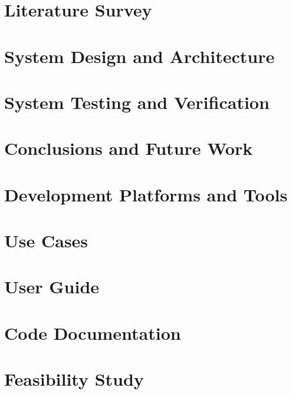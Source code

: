 \documentclass[a4paper,12pt]{article}
\begin{document}
\section{Literature Survey}


\newpage

\section{System Design and Architecture}


\newpage

\section{System Testing and Verification}


\newpage

\section{Conclusions and Future Work}


\newpage


\medskip




\newpage


\appendix

\section{Development Platforms and Tools}


\section{Use Cases}


\section{User Guide}


\section{Code Documentation}


\section{Feasibility Study}


\end{document}
